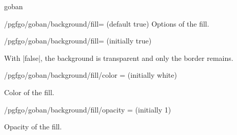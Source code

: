 \begin{environment}{{goban}}
	\begin{key}{/pgfgo/goban/background/fill= (default true)}
		Options of the fill.
	\end{key}

	\begin{key}{/pgfgo/goban/background/fill= (initially true)}

		With |false|, the background is transparent and only the border remains.

		\begin{codeexample}[]

			\begin{goban}[background = {line = {color = red}}, name = a]
			\end{goban}

			\begin{goban}[background = {line = false}, resume = a]
			\end{goban}
		\end{codeexample}
	\end{key}

	\begin{key}{/pgfgo/goban/background/fill/color = (initially white)}

		Color of the fill.

		\begin{codeexample}[]

			\begin{goban}[background = {fill = {color = orange!40}}, name = a]
			\end{goban}

			\begin{goban}[background = {fill = {color = olive!30}}, resume = a]
			\end{goban}
		\end{codeexample}
	\end{key}

	\begin{key}{/pgfgo/goban/background/fill/opacity = (initially 1)}

		Opacity of the fill.

		\begin{codeexample}[]

			\begin{goban}[background = {fill = {color = orange!40}}, name = a]
			\end{goban}


\end{codeexample}
\end{key}
\end{environment}
